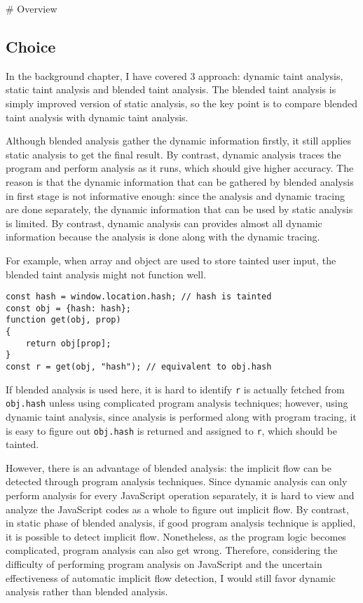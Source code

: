 # Overview

\subsection{Choice}

In the background chapter, I have covered 3 approach: dynamic taint analysis, static taint analysis and blended taint analysis. The blended taint analysis is simply improved version of static analysis, so the key point is to compare blended taint analysis with dynamic taint analysis. 

Although blended analysis gather the dynamic information firstly, it still applies static analysis to get the final result. By contrast, dynamic analysis traces the program and perform analysis as it runs, which should give higher accuracy. The reason is that the dynamic information that can be gathered by blended analysis in first stage is not informative enough: since the analysis and dynamic tracing are done separately, the dynamic information that can be used by static analysis is limited. By contrast, dynamic analysis can provides almost all dynamic information because the analysis is done along with the dynamic tracing.

For example, when array and object are used to store tainted user input, the blended taint analysis might not function well.

\begin{scriptsize}
\estiloJs
\begin{lstlisting}[]
const hash = window.location.hash; // hash is tainted
const obj = {hash: hash};
function get(obj, prop)
{
	return obj[prop];
}
const r = get(obj, "hash"); // equivalent to obj.hash
\end{lstlisting}
\end{scriptsize}


If blended analysis is used here, it is hard to identify \texttt{r} is actually fetched from \texttt{obj.hash} unless using complicated program analysis techniques; however, using dynamic taint analysis, since analysis is performed along with program tracing, it is easy to figure out \texttt{obj.hash} is returned and assigned to \texttt{r}, which should be tainted. 

However, there is an advantage of blended analysis: the implicit flow can be detected through program analysis techniques. Since dynamic analysis can only perform analysis for every JavaScript operation separately, it is hard to view and analyze the JavaScript codes as a whole to figure out implicit flow. By contrast, in static phase of blended analysis, if good program analysis technique is applied, it is possible to detect implicit flow. Nonetheless, as the program logic becomes complicated, program analysis can also get wrong. Therefore, considering the difficulty of performing program analysis on JavaScript and the uncertain effectiveness of automatic implicit flow detection, I would still favor dynamic analysis rather than blended analysis.

